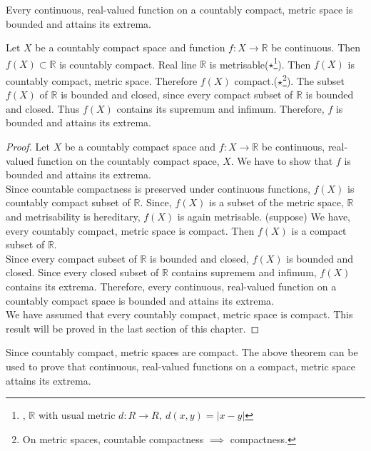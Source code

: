 \begin{theorem}
	Every continuous, real-valued function on a countably compact, metric space is bounded and attains its extrema.
	\cite[11.1.7]{joshi}
\end{theorem}
\begin{synopsis}
	Let $X$ be a countably compact space and function $f : X \to \mathbb{R}$ be continuous.
	Then $f(X) \subset \mathbb{R}$ is countably compact.
	Real line $\mathbb{R}$ is metrisable($\star$\footnote{\cite[4.2 Example 4]{joshi}, $\mathbb{R}$ with usual metric $d:R \to R,\ d(x,y) = |x-y|$}).
	Then $f(X)$ is countably compact, metric space.
	Therefore $f(X)$ compact.($\star$\footnote{\cite[11.1.11]{joshi} On metric spaces, countable compactness $\implies$ compactness.}).
	The subset $f(X)$ of $\mathbb{R}$ is bounded and closed, since every compact subset of $\mathbb{R}$ is bounded and closed.
	Thus $f(X)$ contains its supremum and infimum.
	Therefore, $f$ is bounded and attains its extrema.
\end{synopsis}
\begin{proof}
	Let $X$ be a countably compact space and $f : X \to \mathbb{R}$ be continuous, real-valued function on the countably compact space, $X$.
	We have to show that $f$ is bounded and attains its extrema.\\
	
	
	Since countable compactness is preserved under continuous functions, $f(X)$ is countably compact subset of $\mathbb{R}$.
	Since, $f(X)$ is a subset of the metric space, $\mathbb{R}$ and metrisability is hereditary, $f(X)$ is again metrisable.
	(suppose) We have, every countably compact, metric space is compact.
	Then $f(X)$ is a compact subset of $\mathbb{R}$.\\


	Since every compact subset of $\mathbb{R}$ is bounded and closed, $f(X)$ is bounded and closed.
	Since every closed subset of $\mathbb{R}$ contains supremem and infimum, $f(X)$ contains its extrema.
	Therefore, every continuous, real-valued function on a countably compact space is bounded and attains its extrema.\\


	We have assumed that every countably compact, metric space is compact.
	This result will be proved in the last section of this chapter.
\end{proof}

\begin{remark}
	Since countably compact, metric spaces are compact.
	The above theorem can be used to prove that continuous, real-valued functions on a compact, metric space attains its extrema.
\end{remark}

